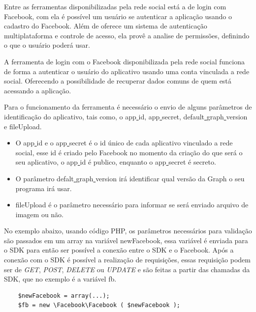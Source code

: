 
Entre as ferramentas disponibilizadas pela rede social está a de login com Facebook, com ela é possível um usuário se autenticar a aplicação usando o cadastro do Facebook. Além de oferece um sistema de autenticação multiplataforma e controle de acesso, ela provê a analise de permissões, definindo o que o usuário poderá usar. \cite{facebook2018c}

A ferramenta de login com o Facebook disponibilizada pela rede social funciona de forma a autenticar o usuário do aplicativo usando uma conta vinculada a rede social. Oferecendo a possibilidade de recuperar dados comuns de quem está acessando a aplicação.

Para o funcionamento da ferramenta é necessário o envio de alguns parâmetros de identificação do aplicativo, tais como, o app\underline{{ }}id, app\underline{{ }}secret, default\underline{{ }}graph\underline{{ }}version e fileUpload.

\begin{itemize}
\item O app\underline{{ }}id e o app\underline{{ }}secret é o id único de cada aplicativo vinculado a rede social, esse id é criado pelo Facebook no momento da criação do que será o seu aplicativo, o app\underline{{ }}id é publico, enquanto o app\underline{{ }}secret é secreto.

\item O parâmetro defalt\underline{{ }}graph\underline{{ }}version irá identificar qual versão da Graph o seu programa irá usar.

\item fileUpload é o parâmetro necessário para informar se será enviado arquivo de imagem ou não.
\end{itemize}

No exemplo abaixo, usando código PHP, os parâmetros necessários para validação são passados em um array na variável newFacebook, essa variável é enviada para o SDK para então ser possível a conexão entre o SDK e o Facebook. Após a conexão com o SDK é possível a realização de requisições, essas requisição podem ser de \textit{GET}, \textit{POST}, \textit{DELETE} ou \textit{UPDATE} e são feitas a partir das chamadas da SDK, que no exemplo é a variável fb.

\begin{lstlisting}
	$newFacebook = array(...);
	$fb = new \Facebook\Facebook ( $newFacebook );
\end{lstlisting}

